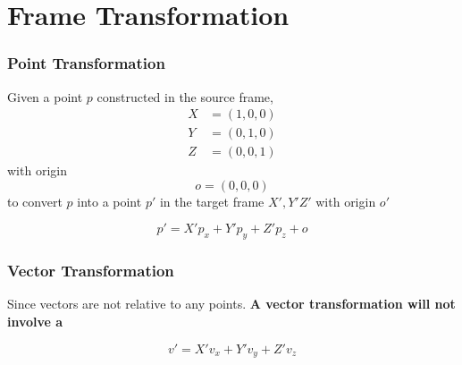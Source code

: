 \chapter{Frame Transformation}

  \subsection{Point Transformation}

    Given a point $ p $ constructed in the source frame,
    \begin{align*}
      X &= \left( 1, 0, 0 \right) \\
      Y &= \left( 0, 1, 0 \right) \\
      Z &= \left( 0, 0, 1 \right)
    \end{align*}
    with origin
    \begin{equation*}
      o = \left( 0, 0, 0 \right)
    \end{equation*}
    to convert $ p $ into a point $ p' $ in the target frame $ X', Y' Z' $
    with origin $ o' $

    \begin{equation}
      p' = X' p_{x} + Y' p_{y} + Z' p_{z} + o
    \end{equation}

  \subsection{Vector Transformation}

    Since vectors are not relative to any points. \textbf{A vector
    transformation will not involve a }

    \begin{equation}
      v' = X' v_{x} + Y' v_{y} + Z' v_{z}
    \end{equation}
